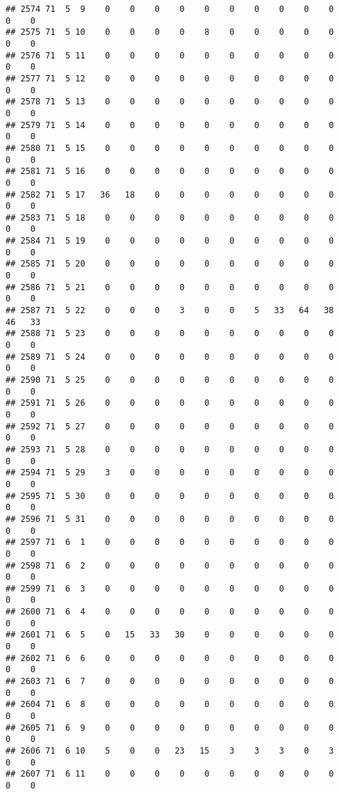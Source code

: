 \documentclass[]{article}
\begin{document}
\begin{verbatim}
## 2574 71  5  9    0    0    0    0    0    0    0    0    0    0    0    0
## 2575 71  5 10    0    0    0    0    8    0    0    0    0    0    0    0
## 2576 71  5 11    0    0    0    0    0    0    0    0    0    0    0    0
## 2577 71  5 12    0    0    0    0    0    0    0    0    0    0    0    0
## 2578 71  5 13    0    0    0    0    0    0    0    0    0    0    0    0
## 2579 71  5 14    0    0    0    0    0    0    0    0    0    0    0    0
## 2580 71  5 15    0    0    0    0    0    0    0    0    0    0    0    0
## 2581 71  5 16    0    0    0    0    0    0    0    0    0    0    0    0
## 2582 71  5 17   36   18    0    0    0    0    0    0    0    0    0    0
## 2583 71  5 18    0    0    0    0    0    0    0    0    0    0    0    0
## 2584 71  5 19    0    0    0    0    0    0    0    0    0    0    0    0
## 2585 71  5 20    0    0    0    0    0    0    0    0    0    0    0    0
## 2586 71  5 21    0    0    0    0    0    0    0    0    0    0    0    0
## 2587 71  5 22    0    0    0    3    0    0    5   33   64   38   46   33
## 2588 71  5 23    0    0    0    0    0    0    0    0    0    0    0    0
## 2589 71  5 24    0    0    0    0    0    0    0    0    0    0    0    0
## 2590 71  5 25    0    0    0    0    0    0    0    0    0    0    0    0
## 2591 71  5 26    0    0    0    0    0    0    0    0    0    0    0    0
## 2592 71  5 27    0    0    0    0    0    0    0    0    0    0    0    0
## 2593 71  5 28    0    0    0    0    0    0    0    0    0    0    0    0
## 2594 71  5 29    3    0    0    0    0    0    0    0    0    0    0    0
## 2595 71  5 30    0    0    0    0    0    0    0    0    0    0    0    0
## 2596 71  5 31    0    0    0    0    0    0    0    0    0    0    0    0
## 2597 71  6  1    0    0    0    0    0    0    0    0    0    0    0    0
## 2598 71  6  2    0    0    0    0    0    0    0    0    0    0    0    0
## 2599 71  6  3    0    0    0    0    0    0    0    0    0    0    0    0
## 2600 71  6  4    0    0    0    0    0    0    0    0    0    0    0    0
## 2601 71  6  5    0   15   33   30    0    0    0    0    0    0    0    0
## 2602 71  6  6    0    0    0    0    0    0    0    0    0    0    0    0
## 2603 71  6  7    0    0    0    0    0    0    0    0    0    0    0    0
## 2604 71  6  8    0    0    0    0    0    0    0    0    0    0    0    0
## 2605 71  6  9    0    0    0    0    0    0    0    0    0    0    0    0
## 2606 71  6 10    5    0    0   23   15    3    3    3    0    3    0    0
## 2607 71  6 11    0    0    0    0    0    0    0    0    0    0    0    0

\end{verbatim}
\end{document}
